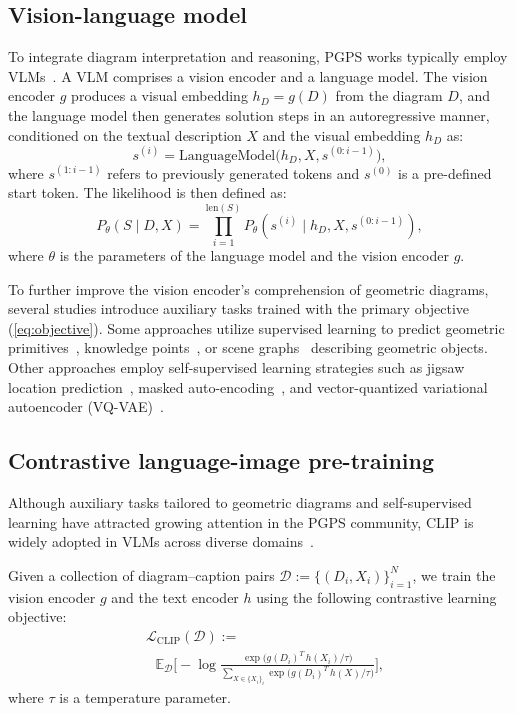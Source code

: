 \subsection{Vision-language model}

To integrate diagram interpretation and reasoning, PGPS works typically employ VLMs~\citep{need-citation}. A VLM comprises a vision encoder and a language model. The vision encoder $g$ produces a visual embedding \(h_D = g(D)\) from the diagram \(D\), and the language model then generates solution steps in an autoregressive manner, conditioned on the textual description \(X\) and the visual embedding \(h_D\) as:
\begin{equation}
s^{(i)} = \mathrm{LanguageModel}\bigl(h_D, X, s^{(0:i-1)}\bigr),
\label{eq:vlm}
\end{equation}
where \(s^{(1:i-1)}\) refers to previously generated tokens and \(s^{(0)}\) is a pre-defined start token.
The likelihood is then defined as:
\begin{equation*}
    P_\theta(S\mid D, X) = \prod_{i=1}^{\textrm{len}(S)}P_\theta\left(s^{(i)} \mid h_D, X, s^{(0:i-1)}\right),
\end{equation*}
where $\theta$ is the parameters of the language model and the vision encoder $g$.

To further improve the vision encoder’s comprehension of geometric diagrams, several studies introduce auxiliary tasks trained with the primary objective (\cref{eq:objective}). Some approaches utilize supervised learning to predict geometric primitives~\citep{}, knowledge points~\citep{}, or scene graphs~\citep{} describing geometric objects. Other approaches employ self-supervised learning strategies such as jigsaw location prediction~\citep{geoqa,geoqa-plus}, masked auto-encoding~\citep{mae}, and vector-quantized variational autoencoder (VQ-VAE)~\citep{vqvae}.

\subsection{Contrastive language-image pre-training}

Although auxiliary tasks tailored to geometric diagrams and self-supervised learning have attracted growing attention in the PGPS community, CLIP is widely adopted in VLMs across diverse domains~\citep{}.

Given a collection of diagram–caption pairs \(\mathcal{D} := \{(D_i, X_i)\}_{i=1}^N\), we train the vision encoder \(g\) and the text encoder \(h\) using the following contrastive learning objective:
\begin{align}
    &\mathcal{L}_{\textrm{CLIP}}(\mathcal{D}) := \nonumber \\
    &\,\,\,\,\mathbb{E}_{\mathcal{D}} \!\biggl[ -\log \frac{\exp \bigl( g(D_i)^T \, h(X_i) / \tau \bigr)}{\sum_{X \in \{X_i\}_i} \exp \bigl( g(D_i)^T \, h(X) / \tau \bigr)} \biggr],
    \label{eq:clip}
\end{align}
where \(\tau\) is a temperature parameter.

